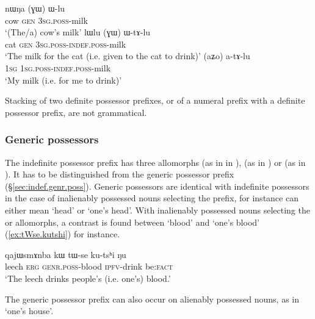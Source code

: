 \begin{exe}
\ex 
\begin{xlist}
\ex \label{ex:nWNa.Wlu}
\gll nɯŋa (ɣɯ) ɯ-lu \\
cow \textsc{gen} \textsc{3sg}.\textsc{poss}-milk \\
\glt `(The/a) cow's milk' 
\ex \label{ex:lWlu.WtAlu}
\gll lɯlu (ɣɯ) ɯ-tɤ-lu \\
cat \textsc{gen} \textsc{3sg}.\textsc{poss}-\textsc{indef}.\textsc{poss}-milk \\
\glt `The milk for the cat (i.e. given to the cat to drink)' 
\ex \label{ex:atAlu}
\gll (aʑo) a-tɤ-lu \\
\textsc{1sg} \textsc{1sg}.\textsc{poss}-\textsc{indef}.\textsc{poss}-milk \\
\glt `My milk (i.e. for me to drink)' 
\end{xlist}
\end{exe}

Stacking of two definite possessor prefixes, or of a numeral prefix with a definite possessor prefix, are not grammatical.

\subsubsection{Generic possessors}
The indefinite possessor prefix has three allomorphs  (as in in ),  (as in ) or  (as in ). It has to be distinguished from the generic possessor prefix  (§\ref{sec:indef.genr.poss}). Generic possessors are identical with indefinite possessors in the case of inalienably possessed nouns selecting the  prefix, for instance  can either mean `head' or `one's head'. With inalienably possessed nouns selecting the  or  allomorphs, a contrast is found between  `blood' and  `one's blood' (\ref{ex:tWse.kutshi}) for instance.

\begin{exe}
\ex \label{ex:tWse.kutshi}
\gll qajɯsmɤnba kɯ tɯ-se ku-tsʰi ŋu \\
leech \textsc{erg} \textsc{genr}.\textsc{poss}-blood \textsc{ipfv}-drink be:\textsc{fact} \\
\glt `The leech drinks people's (i.e. one's) blood.' 
\end{exe}

The generic possessor prefix can also occur on alienably possessed nouns, as in  `one's house'. 


